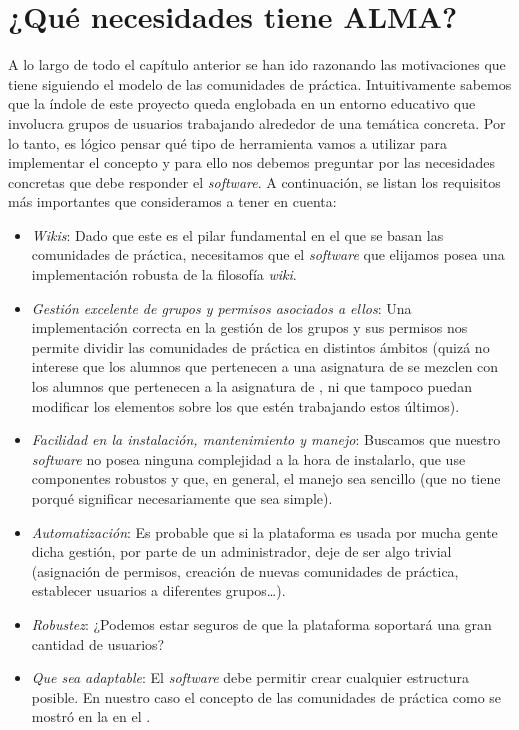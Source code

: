 \section{¿Qué necesidades tiene ALMA?}

A lo largo de todo el capítulo anterior se han ido razonando las motivaciones que tiene \alma{} siguiendo el modelo de las comunidades de práctica. Intuitivamente sabemos que la índole de este proyecto queda englobada en un entorno educativo que involucra grupos de usuarios trabajando alrededor de una temática concreta. Por lo tanto, es lógico pensar qué tipo de herramienta vamos a utilizar para implementar el concepto y para ello nos debemos preguntar por las necesidades concretas que debe responder el \textit{software}. A continuación, se listan los requisitos más importantes que consideramos a tener en cuenta:

\begin{itemize}
\item \textit{Wikis}: Dado que este es el pilar fundamental en el que se basan las comunidades de práctica, necesitamos que el \textit{software} que elijamos posea una implementación robusta de la filosofía \textit{wiki}. 

\item \textit{Gestión excelente de grupos y permisos asociados a ellos}: Una implementación correcta en la gestión de los grupos y sus permisos nos permite dividir las comunidades de práctica en distintos ámbitos (quizá no interese que los alumnos que pertenecen a una asignatura de  se mezclen con los alumnos que pertenecen a la asignatura de , ni que tampoco puedan modificar los elementos sobre los que estén trabajando estos últimos).

\item \textit{Facilidad en la instalación, mantenimiento y manejo}: Buscamos que nuestro \textit{software} no posea ninguna complejidad a la hora de instalarlo, que use componentes robustos y que, en general, el manejo sea sencillo (que no tiene porqué significar necesariamente que sea simple).

\item \textit{Automatización}: Es probable que si la plataforma es usada por mucha gente dicha gestión, por parte de un administrador, deje de ser algo trivial (asignación de permisos, creación de nuevas comunidades de práctica, establecer usuarios a diferentes grupos\ldots).

\item \textit{Robustez}: ¿Podemos estar seguros de que la plataforma soportará una gran cantidad de usuarios?

\item \textit{Que sea adaptable}: El \textit{software} debe permitir crear cualquier estructura posible. En nuestro caso el concepto de las comunidades de práctica como se mostró en la  en el .
\end{itemize}

